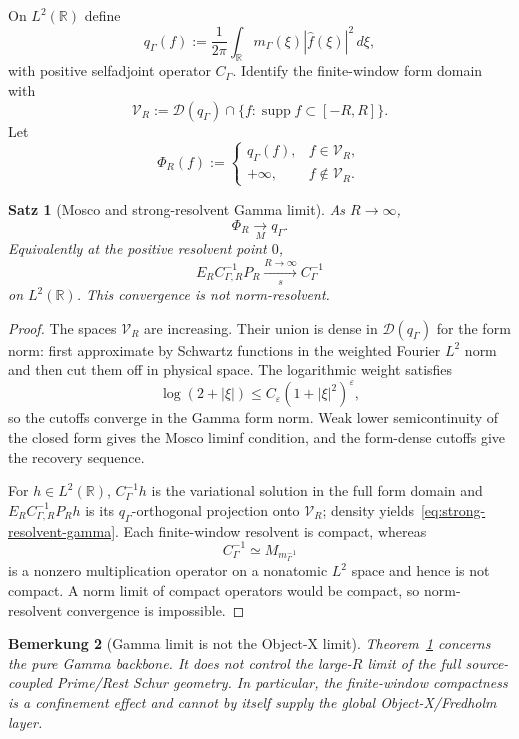 \documentclass[11pt,a4paper]{amsart}
\newtheorem{theorem}{Satz}[section]
\newtheorem{remark}[theorem]{Bemerkung}
\begin{document}
On $L^2(\mathbb R)$ define
\[
 q_\Gamma(f)
 :=\frac1{2\pi}\int_{\mathbb R}m_\Gamma(\xi)|\widehat f(\xi)|^2\,d\xi,
\tag{3.12}\label{eq:global-gamma-form}
\]
with positive selfadjoint operator $C_\Gamma$.
Identify the finite-window form domain with
\[
 \mathcal V_R:=\mathcal D(q_\Gamma)\cap
 \{f:\operatorname{supp}f\subset[-R,R]\}.
\]
Let
\[
 \Phi_R(f):=
 \begin{cases}
 q_\Gamma(f),&f\in\mathcal V_R,\\
 +\infty,&f\notin\mathcal V_R.
 \end{cases}
\tag{3.13}\label{eq:mosco-functional}
\]

\begin{theorem}[Mosco and strong-resolvent Gamma limit]\label{thm:mosco}
As $R\to\infty$,
\[
 \boxed{\Phi_R\xrightarrow[M]{}q_\Gamma.}
\tag{3.14}\label{eq:mosco-limit}
\]
Equivalently at the positive resolvent point $0$,
\[
 \boxed{
 E_RC_{\Gamma,R}^{-1}P_R
 \xrightarrow[s]{R\to\infty}
 C_\Gamma^{-1}
 }
\tag{3.15}\label{eq:strong-resolvent-gamma}
\]
on $L^2(\mathbb R)$.  This convergence is not norm-resolvent.
\end{theorem}

\begin{proof}
The spaces $\mathcal V_R$ are increasing.  Their union is dense in
$\mathcal D(q_\Gamma)$ for the form norm: first approximate by Schwartz functions in the
weighted Fourier $L^2$ norm and then cut them off in physical space.  The logarithmic
weight satisfies
\[
 \log(2+|\xi|)\le C_\varepsilon(1+|\xi|^2)^\varepsilon,
\]
so the cutoffs converge in the Gamma form norm.  Weak lower semicontinuity of the closed
form gives the Mosco liminf condition, and the form-dense cutoffs give the recovery
sequence.

For $h\in L^2(\mathbb R)$, $C_\Gamma^{-1}h$ is the variational solution in the full form
domain and $E_RC_{\Gamma,R}^{-1}P_Rh$ is its $q_\Gamma$-orthogonal projection onto
$\mathcal V_R$; density yields~\eqref{eq:strong-resolvent-gamma}.  Each finite-window resolvent is compact,
whereas
\[
 C_\Gamma^{-1}\simeq M_{m_\Gamma^{-1}}
\]
is a nonzero multiplication operator on a nonatomic $L^2$ space and hence is not
compact.  A norm limit of compact operators would be compact, so norm-resolvent
convergence is impossible.
\end{proof}

\begin{remark}[Gamma limit is not the Object-X limit]\label{rem:gamma-limit}
Theorem~\ref{thm:mosco} concerns the pure Gamma backbone.  It does not control the
large-$R$ limit of the full source-coupled Prime/Rest Schur geometry.  In particular,
the finite-window compactness is a confinement effect and cannot by itself supply the
global Object-X/Fredholm layer.
\end{remark}
\end{document}
